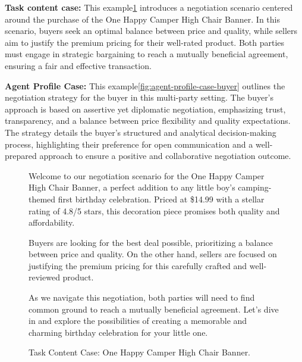 \textbf{Task content case:} This example\ref{fig:task-content-banner} introduces a negotiation scenario centered around the purchase of the One Happy Camper High Chair Banner. In this scenario, buyers seek an optimal balance between price and quality, while sellers aim to justify the premium pricing for their well-rated product. Both parties must engage in strategic bargaining to reach a mutually beneficial agreement, ensuring a fair and effective transaction.

\textbf{Agent Profile Case:} This example\ref{fig:agent-profile-case-buyer} outlines the negotiation strategy for the buyer in this multi-party setting. The buyer’s approach is based on assertive yet diplomatic negotiation, emphasizing trust, transparency, and a balance between price flexibility and quality expectations. The strategy details the buyer’s structured and analytical decision-making process, highlighting their preference for open communication and a well-prepared approach to ensure a positive and collaborative negotiation outcome.
\begin{figure}[htbp]
\centering
\begin{tcolorbox}[colback=green!2!white, colframe=gray!50!green]
\begin{minipage}{\linewidth}
\small
Welcome to our negotiation scenario for the One Happy Camper High Chair Banner, a perfect addition to any little boy's camping-themed first birthday celebration. Priced at \$14.99 with a stellar rating of 4.8/5 stars, this decoration piece promises both quality and affordability.

Buyers are looking for the best deal possible, prioritizing a balance between price and quality. On the other hand, sellers are focused on justifying the premium pricing for this carefully crafted and well-reviewed product.

As we navigate this negotiation, both parties will need to find common ground to reach a mutually beneficial agreement. Let's dive in and explore the possibilities of creating a memorable and charming birthday celebration for your little one.

\end{minipage}
\end{tcolorbox}
\caption{Task Content Case: One Happy Camper High Chair Banner.}
\label{fig:task-content-banner}
\end{figure}

